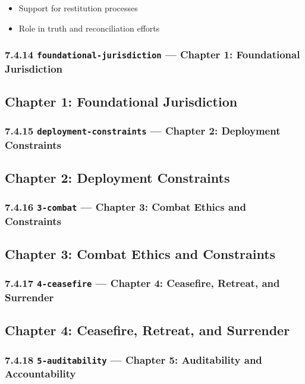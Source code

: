 \documentclass[11pt]{article}
\begin{document}
\begin{itemize}\setlength\itemsep{0pt}
\item Support for restitution processes
\item Role in truth and reconciliation efforts
\end{itemize}


\subsubsection*{7.4.14 \texttt{foundational-jurisdiction} — Chapter 1: Foundational Jurisdiction}


\subsection*{Chapter 1: Foundational Jurisdiction}


\subsubsection*{7.4.15 \texttt{deployment-constraints} — Chapter 2: Deployment Constraints}


\subsection*{Chapter 2: Deployment Constraints}


\subsubsection*{7.4.16 \texttt{3-combat} — Chapter 3: Combat Ethics and Constraints}


\subsection*{Chapter 3: Combat Ethics and Constraints}


\subsubsection*{7.4.17 \texttt{4-ceasefire} — Chapter 4: Ceasefire, Retreat, and Surrender}


\subsection*{Chapter 4: Ceasefire, Retreat, and Surrender}


\subsubsection*{7.4.18 \texttt{5-auditability} — Chapter 5: Auditability and Accountability}
\end{document}
